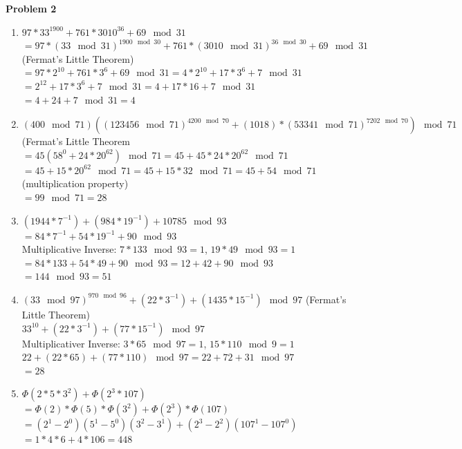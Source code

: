\documentclass{article}
\begin{document}
\textbf{Problem 2}
\begin{enumerate}
	\item $97*33^{1900}+761*3010^{36}+69\mod 31$\\
		$=97*(33\mod 31)^{1900\mod 30}+761*(3010\mod 31)^{36\mod 30}+69\mod 31$ (Fermat's Little Theorem)\\
		$=97*2^{10}+761*3^{6}+69\mod 31=4*2^{10}+17*3^6+7\mod 31$\\
		$=2^{12}+17*3^6+7\mod 31=4+17*16+7\mod 31$\\
		$=4+24+7\mod 31=4$
	\item $(400\mod 71)((123456\mod 71)^{4200\mod 70}+(1018)*(53341\mod 71)^{7202\mod 70})\mod 71$(Fermat's Little Theorem\\
		$=45(58^0+24*20^{62})\mod 71=45+45*24*20^{62}\mod 71$\\
		$=45+15*20^{62}\mod 71=45+15*32\mod 71=45+54\mod 71$ (multiplication property)\\$=99\mod 71=28$
	\item $(1944*7^{-1})+(984*19^{-1})+10785\mod 93$\\
		$=84*7^{-1}+54*19^{-1}+90\mod 93$\\
		Multiplicative Inverse: $7*133\mod 93=1$, $19*49\mod 93=1$\\
		$=84*133+54*49+90\mod 93=12+42+90\mod 93$\\$=144\mod 93=51$
	\item $(33\mod 97)^{970\mod 96}+(22*3^{-1})+(1435*15^{-1})\mod 97$ (Fermat's Little Theorem)\\
		$33^{10}+(22*3^{-1})+(77*15^{-1})\mod 97$\\
		Multiplicativer Inverse: $3*65\mod 97=1$, $15*110\mod 9=1$\\
		$22+(22*65)+(77*110)\mod 97=22+72+31\mod 97$\\$=28$
	\item $\Phi(2*5*3^2)+\Phi(2^3*107)$\\
		$=\Phi(2)*\Phi(5)*\Phi(3^2)+\Phi(2^3)*\Phi(107)$\\
		$=(2^1-2^0)(5^1-5^0)(3^2-3^1)+(2^3-2^2)(107^1-107^0)$\\
		$=1*4*6+4*106=448$
\end{enumerate}
\end{document}
